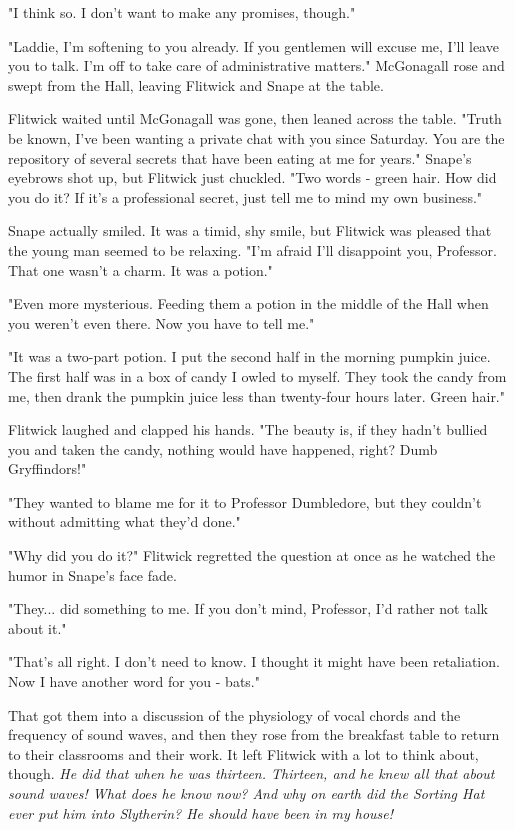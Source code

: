 \documentclass[a4paper,11pt]{article}
\begin{document}
"I think so. I don't want to make any promises, though."

"Laddie, I'm softening to you already. If you gentlemen will excuse me, I'll leave you to talk. I'm off to take care of administrative matters." McGonagall rose and swept from the Hall, leaving Flitwick and Snape at the table.

Flitwick waited until McGonagall was gone, then leaned across the table. "Truth be known, I've been wanting a private chat with you since Saturday. You are the repository of several secrets that have been eating at me for years." Snape's eyebrows shot up, but Flitwick just chuckled. "Two words - green hair. How did you do it? If it's a professional secret, just tell me to mind my own business."

Snape actually smiled. It was a timid, shy smile, but Flitwick was pleased that the young man seemed to be relaxing. "I'm afraid I'll disappoint you, Professor. That one wasn't a charm. It was a potion."

"Even more mysterious. Feeding them a potion in the middle of the Hall when you weren't even there. Now you have to tell me."

"It was a two-part potion. I put the second half in the morning pumpkin juice. The first half was in a box of candy I owled to myself. They took the candy from me, then drank the pumpkin juice less than twenty-four hours later. Green hair."

Flitwick laughed and clapped his hands. "The beauty is, if they hadn't bullied you and taken the candy, nothing would have happened, right? Dumb Gryffindors!"

"They wanted to blame me for it to Professor Dumbledore, but they couldn't without admitting what they'd done."

"Why did you do it?" Flitwick regretted the question at once as he watched the humor in Snape's face fade.

"They... did something to me. If you don't mind, Professor, I'd rather not talk about it."

"That's all right. I don't need to know. I thought it might have been retaliation. Now I have another word for you - bats."

That got them into a discussion of the physiology of vocal chords and the frequency of sound waves, and then they rose from the breakfast table to return to their classrooms and their work. It left Flitwick with a lot to think about, though. \emph{He did that when he was thirteen. Thirteen, and he knew all that about sound waves! What does he know now? And why on earth did the Sorting Hat ever put him into Slytherin? He should have been in my house!}
\end{document}
